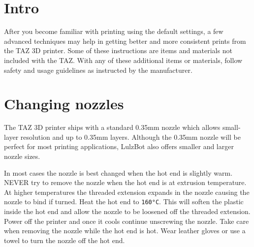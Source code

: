 %
%
%
%
%
%

\section{Intro}
After you become familiar with printing using the default settings, a few advanced techniques may help in getting better and more consistent prints from the TAZ 3D printer. Some of these instructions are items and materials not included with the TAZ. With any of these additional items or materials, follow safety and usage guidelines as instructed by the manufacturer.

\section{Changing nozzles}
The TAZ 3D printer ships with a standard 0.35mm nozzle which allows small-layer resolution and up to 0.35mm layers. Although the 0.35mm nozzle will be perfect for most printing applications, LulzBot also offers smaller and larger nozzle sizes.

In most cases the nozzle is best changed when the hot end is slightly warm. NEVER try to remove the nozzle when the hot end is at extrusion temperature. At higher temperatures the threaded extension expands in the nozzle causing the nozzle to bind if turned. Heat the hot end to \texttt{160°C}. This will soften the plastic inside the hot end and allow the nozzle to be loosened off the threaded extension. Power off the printer and once it cools continue unscrewing the nozzle. Take care when removing the nozzle while the hot end is hot. Wear leather gloves or use a towel to turn the nozzle off the hot end.


